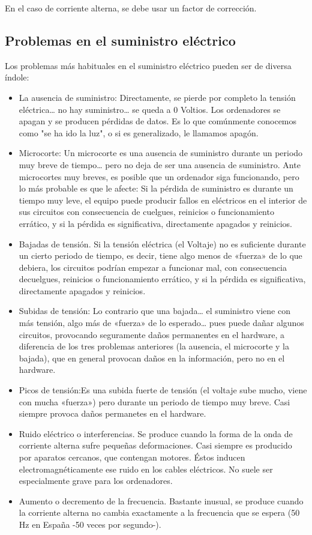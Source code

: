 \documentclass[a4paper]{article}
\begin{document}
En el caso de corriente alterna, se debe usar un factor de corrección.  
\subsection{Problemas en el suministro eléctrico}
\label{sec:org000006c}

Los problemas más habituales en el suministro eléctrico pueden ser de diversa índole:
\begin{itemize}
\item La ausencia de suministro: Directamente, se pierde por completo la tensión eléctrica\ldots{} no hay suministro\ldots{} se queda a 0 Voltios. Los ordenadores se apagan y se producen pérdidas de datos. Es lo que comúnmente conocemos como "se ha ido la luz", o si es generalizado, le llamamos apagón.
\item Microcorte: Un microcorte es una ausencia de suministro durante un periodo muy breve de tiempo\ldots{} pero no deja de ser una ausencia de suministro. Ante microcortes muy breves, es posible que un ordenador siga funcionando, pero lo más probable es que le afecte: Si la pérdida de suministro es durante un tiempo muy leve, el equipo puede producir fallos en eléctricos en el interior de sus circuitos con consecuencia de cuelgues, reinicios o funcionamiento errático, y si la pérdida es significativa, directamente apagados y reinicios.
\item Bajadas de tensión. Si la tensión eléctrica (el Voltaje) no es suficiente durante un cierto periodo de tiempo, es decir, tiene algo menos de «fuerza» de lo que debiera, los circuitos podrían empezar a funcionar mal, con consecuencia decuelgues, reinicios o funcionamiento errático, y si la pérdida es significativa, directamente apagados y reinicios.
\item Subidas de tensión: Lo contrario que una bajada\ldots{} el suministro viene con más tensión, algo más de «fuerza» de lo esperado\ldots{} pues puede dañar algunos circuitos, provocando seguramente daños permanentes en el hardware, a diferencia de los tres problemas anteriores (la ausencia, el microcorte y la bajada), que en general provocan daños en la información, pero no en el hardware.
\item Picos de tensión:Es una subida fuerte de tensión (el voltaje sube mucho, viene con mucha «fuerza») pero durante un periodo de tiempo muy breve. Casi siempre provoca daños permanetes en el hardware.
\item Ruido eléctrico o interferencias. Se produce cuando la forma de la onda de corriente alterna sufre pequeñas deformaciones. Casi siempre es producido por aparatos cercanos, que contengan motores. Éstos inducen electromagnéticamente ese ruido en los cables eléctricos. No suele ser especialmente grave para los ordenadores.
\item Aumento o decremento de la frecuencia. Bastante inusual, se produce cuando la corriente alterna no cambia exactamente a la frecuencia que se espera (50 Hz en España -50 veces por segundo-).
\end{itemize}
\end{document}
